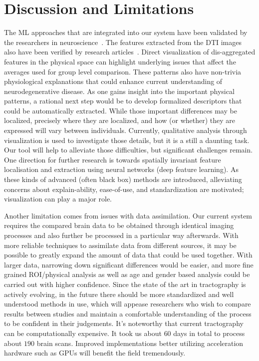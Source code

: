 \section{Discussion and Limitations}

The ML approaches that are integrated into our system have been validated by the researchers in neuroscience~\cite{mateos2018structural,tanveer2020machine}. The features extracted from the DTI images also have been verified by research articles~\cite{acosta2016whole, wen2016white}. Direct visualization of dis-aggregated features in the physical space can highlight underlying issues that affect the averages used for group level comparison. These patterns also have non-trivia physiological explanations that could enhance current understanding of neurodegenerative disease. As one gains insight into the important physical patterns, a rational next step would be to develop formalized descriptors that could be automatically extracted. While those important differences may be localized, precisely where they are localized, and how (or whether) they are expressed will vary between individuals. Currently, qualitative analysis through visualization is used to investigate those details, but it is a still a daunting task. Our tool will help to alleviate those difficulties, but significant challenges remain. One direction for further research is towards spatially invariant feature localisation and extraction using  neural networks (deep feature learning). As these kinds of advanced (often black box) methods are introduced, alleviating concerns about explain-ability, ease-of-use, and standardization are motivated; visualization can play a major role.

Another limitation comes from issues with data assimilation. Our current system requires the compared brain data to be obtained through identical imaging processes and also further be processed in a particular way afterwards. With more reliable techniques to assimilate data from different sources, it may be possible to greatly expand the amount of data that could be used together. With larger data, narrowing down significant differences would be easier, and more fine grained ROI/physical analysis as well as age and gender based analysis could be carried out with higher confidence. Since the state of the art in tractography is actively evolving, in the future there should be more standardized and well understood methods in use, which will appease researchers who wish to compare results between studies and maintain a comfortable understanding of the process to be confident in their judgements. 
It's noteworthy that 
current tractography can be computationally expensive. It took us about $60$ days in total to process about $190$ brain scans. Improved implementations better utilizing acceleration hardware such as GPUs will benefit the field tremendously. 


